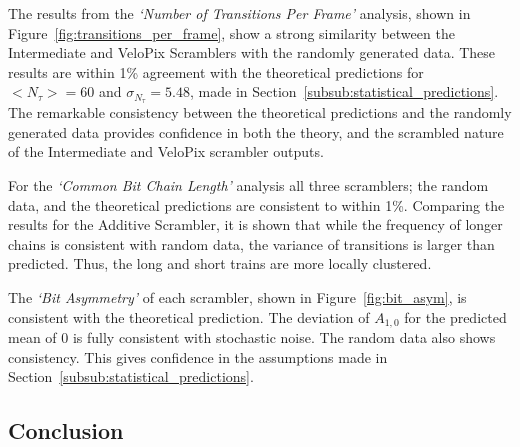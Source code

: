 			The results from the \textit{`Number of Transitions Per Frame'} analysis, shown in Figure~\ref{fig:transitions_per_frame}, show a strong similarity between the Intermediate and VeloPix Scramblers with the randomly generated data. 
			These results are within 1\% agreement with the theoretical predictions for $<N_\tau> = 60$ and $\sigma_{N_\tau} = 5.48$, made in Section~\ref{subsub:statistical_predictions}. 
			The remarkable consistency between the theoretical predictions and the randomly generated data provides confidence in both the theory, and the scrambled nature of the Intermediate and VeloPix scrambler outputs.
			\par
			For the \textit{`Common Bit Chain Length'} analysis all three scramblers; the random data, and the theoretical predictions are consistent to within 1\%. 
			Comparing the results for the Additive Scrambler, it is shown that while the frequency of longer chains is consistent with random data, the variance of transitions is larger than predicted. 
			Thus, the long and short trains are more locally clustered. 
			\par
			The \textit{`Bit Asymmetry'} of each scrambler, shown in Figure~\ref{fig:bit_asym}, is consistent with the theoretical prediction. 
			The deviation of $A_{1,0}$ for the predicted mean of 0 is fully consistent with stochastic noise. 
			The random data also shows consistency. 
			This gives confidence in the assumptions made in Section~\ref{subsub:statistical_predictions}.		

	\subsection{Conclusion}

